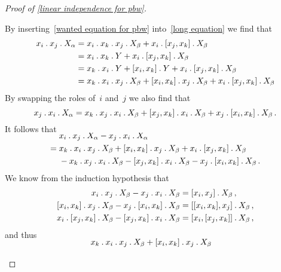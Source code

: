 \begin{proof}[Proof of \cref{linear independence for pbw}]
\begin{description}
      By inserting~\eqref{wanted equation for pbw} into~\eqref{long equation} we find that
      \begin{align*}
        x_i \mathbin{.} x_j \mathbin{.} X_\alpha
        &=
        x_i \mathbin{.} x_k \mathbin{.} x_j \mathbin{.} X_\beta
        + x_i \mathbin{.} [x_j, x_k] \mathbin{.} X_\beta
        \\
        &=
        x_i \mathbin{.} x_k \mathbin{.} Y
        + x_i \mathbin{.} [x_j, x_k] \mathbin{.} X_\beta
        \\
        &=
        x_k \mathbin{.} x_i \mathbin{.} Y
        + [x_i, x_k] \mathbin{.} Y
        + x_i \mathbin{.} [x_j, x_k] \mathbin{.} X_\beta
        \\
        &=
        x_k \mathbin{.} x_i \mathbin{.} x_j \mathbin{.} X_\beta
        + [x_i, x_k] \mathbin{.} x_j \mathbin{.} X_\beta
        + x_i \mathbin{.} [x_j, x_k] \mathbin{.} X_\beta
      \end{align*}
      By swapping the roles of~$i$ and~$j$ we also find that
      \[
        x_j \mathbin{.} x_i \mathbin{.} X_\alpha
        =
        x_k \mathbin{.} x_j \mathbin{.} x_i \mathbin{.} X_\beta
        + [x_j, x_k] \mathbin{.} x_i \mathbin{.} X_\beta
        + x_j \mathbin{.} [x_i, x_k] \mathbin{.} X_\beta \,.
      \]
      It follows that
      \begin{align*}
        \SwapAboveDisplaySkip
        {}&
        x_i \act x_j \act X_\alpha
        - x_j \act x_i \act X_\alpha
        \\
        ={}&
        x_k \act x_i \act x_j \act X_\beta
        + [x_i, x_k] \act x_j \act X_\beta
        + x_i \act [x_j, x_k] \act X_\beta
        \\
        {}&
        - x_k \act x_j \act x_i \act X_\beta
        - [x_j, x_k] \act x_i \act X_\beta
        - x_j \act [x_i, x_k] \act X_\beta \,.
      \end{align*}
      We know from the induction hypothesis that
      \begin{align*}
        x_i \mathbin{.} x_j \mathbin{.} X_\beta
        - x_j \mathbin{.} x_i \mathbin{.} X_\beta
        &=
        [x_i, x_j] \mathbin{.} X_\beta \,,
        \\
        [x_i, x_k] \mathbin{.} x_j \mathbin{.} X_\beta
        - x_j \mathbin{.} [x_i, x_k] \mathbin{.} X_\beta
        &=
        [ [x_i, x_k], x_j ] \mathbin{.} X_\beta \,,
        \\
        x_i \mathbin{.} [x_j, x_k] \mathbin{.} X_\beta
        - [x_j, x_k] \mathbin{.} x_i \mathbin{.} X_\beta
        &=
        [ x_i, [x_j, x_k] ] \mathbin{.} X_\beta \,,
      \end{align*}
      and thus
      \begin{align*}
        \SwapAboveDisplaySkip
        {}&
        x_k \act x_i \act x_j \act X_\beta
        + [x_i, x_k] \act x_j \act X_\beta

\end{align*}
\end{description}
\end{proof}
